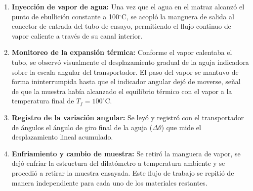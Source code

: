 \begin{enumerate}
    \item \textbf{Inyección de vapor de agua:} Una vez que el agua en el matraz alcanzó el punto de ebullición constante a 100$^\circ$C, se acopló la manguera de salida al conector de entrada del tubo de ensayo, permitiendo el flujo continuo de vapor caliente a través de su canal interior.
    \item \textbf{Monitoreo de la expansión térmica:} Conforme el vapor calentaba el tubo, se observó visualmente el desplazamiento gradual de la aguja indicadora sobre la escala angular del transportador. El paso del vapor se mantuvo de forma ininterrumpida hasta que el indicador angular dejó de moverse, señal de que la muestra había alcanzado el equilibrio térmico con el vapor a la temperatura final de $T_f = 100^\circ$C.
    \item \textbf{Registro de la variación angular:} Se leyó y registró con el transportador de ángulos el ángulo de giro final de la aguja ($\Delta\theta$) que mide el desplazamiento lineal acumulado.
    \item \textbf{Enfriamiento y cambio de muestra:} Se retiró la manguera de vapor, se dejó enfriar la estructura del dilatómetro a temperatura ambiente y se procedió a retirar la muestra ensayada. Este flujo de trabajo se repitió de manera independiente para cada uno de los materiales restantes.
\end{enumerate}